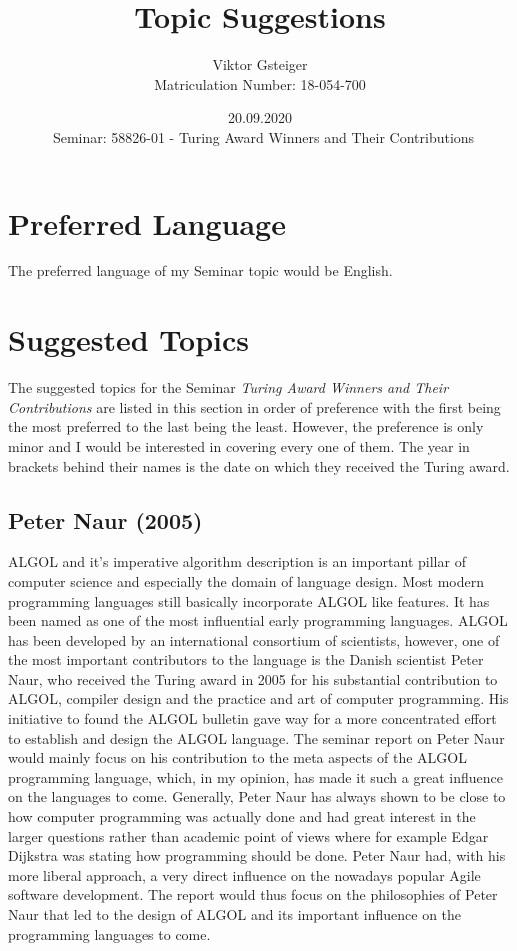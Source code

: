 \documentclass{article}
\author{Viktor Gsteiger \\ Matriculation Number: 18-054-700}
\title{Topic Suggestions}
\date{20.09.2020 \\\ Seminar: 58826-01 - Turing Award Winners and Their Contributions}
\begin{document}
\maketitle

\section{Preferred Language}
The preferred language of my Seminar topic would be English.

\section{Suggested Topics}
The suggested topics for the Seminar \textit{Turing Award Winners and Their Contributions} are listed in this section in order of preference with the first being the most preferred to the last being the least. However, the preference is only minor and I would be interested in covering every one of them. The year in brackets behind their names is the date on which they received the Turing award. 

\subsection{Peter Naur (2005)}

ALGOL and it's imperative algorithm description is an important pillar of computer science and especially the domain of language design. Most modern programming languages still basically incorporate ALGOL like features. It has been named as one of the most influential early programming languages. ALGOL has been developed by an international consortium of scientists, however, one of the most important contributors to the language is the Danish scientist Peter Naur, who received the Turing award in 2005 for his substantial contribution to ALGOL, compiler design and the practice and art of computer programming. His initiative to found the ALGOL bulletin gave way for a more concentrated effort to establish and design the ALGOL language. The seminar report on Peter Naur would mainly focus on his contribution to the meta aspects of the ALGOL programming language, which, in my opinion, has made it such a great influence on the languages to come. Generally, Peter Naur has always shown to be close to how computer programming was actually done and had great interest in the larger questions rather than academic point of views where for example Edgar Dijkstra was stating how programming should be done. Peter Naur had, with his more liberal approach, a very direct influence on the nowadays popular Agile software development. The report would thus focus on the philosophies of Peter Naur that led to the design of ALGOL and its important influence on the programming languages to come.
\end{document}

